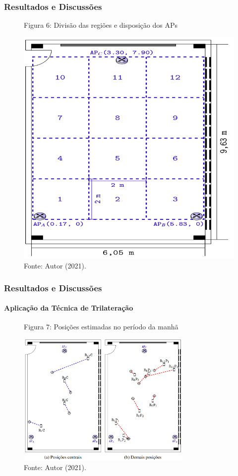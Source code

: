 \documentclass[xcolor={dvipsnames,svgnames,table}]{beamer}
\begin{document}
	\begin{frame}
		\frametitle{Resultados e Discussões}	
		\begin{figure}
			\caption*{Figura 6: Divisão das regiões e disposição dos APs}
			\vspace{-5pt}
			\centering
			\includegraphics[width=0.55\linewidth]{imgs/mapeamento.PNG}
			\vspace{-5pt}
			\caption*{\tiny{Fonte: Autor (2021).}}
		\end{figure}
	\end{frame}

	\begin{frame}
		\frametitle{Resultados e Discussões}
		\framesubtitle{Aplicação da Técnica de Trilateração}
		\begin{figure}
			\caption*{Figura 7: Posições estimadas no período da manhã}
			\vspace{-5pt}
			\centering
			\includegraphics[width=8.5cm, height=6.5cm]{imgs/manha.PNG}
			\vspace{-5pt}
			\caption*{\tiny{Fonte: Autor (2021).}}
		\end{figure}
	\end{frame}
\end{document}
